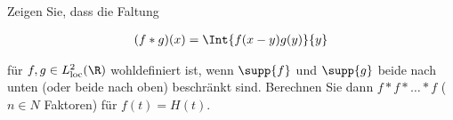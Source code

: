 
\begin{exercise}

Zeigen Sie, dass die Faltung

\begin{align*}
    (f \ast g)(x)
    =
    \Int{f(x - y) g(y)}{y}
\end{align*}

für $f, g \in L^2_{\text{loc}}(\R)$ wohldefiniert ist, wenn $\supp{f}$ und $\supp{g}$ beide nach unten (oder beide nach oben) beschränkt sind.
Berechnen Sie dann $f \ast f \ast \ldots \ast f$ ($n \in N$ Faktoren) für $f(t) = H(t)$.

\end{exercise}


